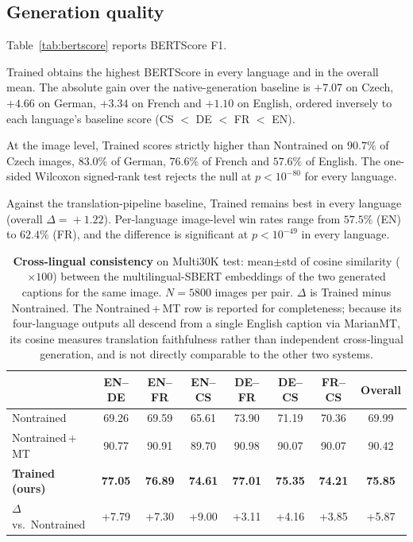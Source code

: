 \documentclass[11pt]{article}
\begin{document}
\subsection{Generation quality}

Table~\ref{tab:bertscore} reports BERTScore F1.

Trained obtains the highest BERTScore in every language and in the
overall mean. The absolute gain over the native-generation baseline is
$+7.07$ on Czech, $+4.66$ on German, $+3.34$ on French and $+1.10$ on
English, ordered inversely to each language's baseline score
(CS $<$ DE $<$ FR $<$ EN).

At the image level, Trained scores strictly higher than Nontrained on
$90.7\%$ of Czech images, $83.0\%$ of German, $76.6\%$ of French and
$57.6\%$ of English. The one-sided Wilcoxon signed-rank test rejects
the null at $p<10^{-80}$ for every language.

Against the translation-pipeline baseline, Trained remains best in
every language (overall $\Delta\!=\!+1.22$). Per-language image-level
win rates range from $57.5\%$ (EN) to $62.4\%$ (FR), and the
difference is significant at $p<10^{-49}$ in every language.

\begin{table}[t]
\centering
\caption{\textbf{Cross-lingual consistency} on Multi30K test:
mean$\pm$std of cosine similarity ($\times 100$) between the
multilingual-SBERT embeddings of the two generated captions for the
same image. $N\!=\!5800$ images per pair. $\Delta$ is Trained minus
Nontrained. The Nontrained\,+\,MT row is reported for completeness;
because its four-language outputs all descend from a single English
caption via MarianMT, its cosine measures translation faithfulness
rather than independent cross-lingual generation, and is not directly
comparable to the other two systems.}
\label{tab:consistency}
\small
\begin{tabular}{lccccccc}
\toprule
& EN--DE & EN--FR & EN--CS & DE--FR & DE--CS & FR--CS & Overall \\
\midrule
Nontrained                    & 69.26 & 69.59 & 65.61 & 73.90 & 71.19 & 70.36 & 69.99 \\
Nontrained\,+\,MT             & 90.77 & 90.91 & 89.70 & 90.98 & 90.07 & 90.07 & 90.42 \\
\textbf{Trained (ours)}       & \textbf{77.05} & \textbf{76.89} & \textbf{74.61} & \textbf{77.01} & \textbf{75.35} & \textbf{74.21} & \textbf{75.85} \\
\midrule
$\Delta$ vs.\ Nontrained      & +7.79 & +7.30 & +9.00 & +3.11 & +4.16 & +3.85 & +5.87 \\
\bottomrule
\end{tabular}
\end{table}
\end{document}
